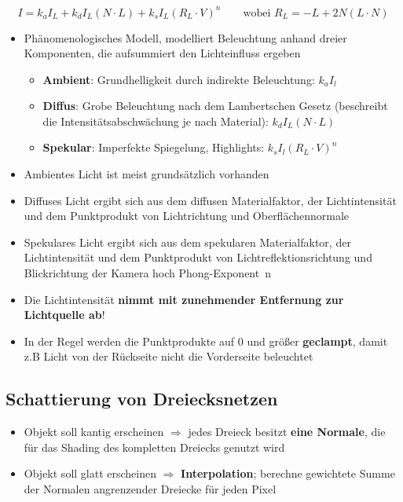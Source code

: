 \documentclass[10pt,a4paper]{article}
\begin{document}
        $$I = k_a I_L + k_d I_L (N \cdot L) + k_s I_L (R_L \cdot V)^n \qquad \text{wobei } R_L = -L + 2N(L \cdot N)$$
	\begin{itemize}
		\item Phänomenologisches Modell, modelliert Beleuchtung anhand dreier Komponenten, die aufsummiert den Lichteinfluss ergeben
		\begin{itemize}
			\item \textbf{Ambient}: Grundhelligkeit durch indirekte Beleuchtung: $k_a I_l$
			\item \textbf{Diffus}: Grobe Beleuchtung nach dem Lambertschen Gesetz (beschreibt die Intensitätsabschwächung je nach Material):
                          $k_d I_L (N \cdot L)$
			\item \textbf{Spekular}: Imperfekte Spiegelung, \glqq Highlights\grqq:
                          $k_s I_l (R_L \cdot V)^n$
		\end{itemize}
		\item Ambientes Licht ist meist grundsätzlich vorhanden
		\item Diffuses Licht ergibt sich aus dem diffusen Materialfaktor, der Lichtintensität und dem Punktprodukt von Lichtrichtung und Oberflächennormale
		\item Spekulares Licht ergibt sich aus dem spekularen Materialfaktor, der Lichtintensität und dem Punktprodukt von Lichtreflektionsrichtung und Blickrichtung der Kamera hoch \glqq Phong-Exponent\grqq\ n
		\item Die Lichtintensität \textbf{nimmt mit zunehmender Entfernung zur Lichtquelle ab}!
		\item In der Regel werden die Punktprodukte auf 0 und größer \textbf{\glqq geclampt\grqq}, damit z.B Licht von der Rückseite nicht die Vorderseite beleuchtet
        \end{itemize}

	\subsection{Schattierung von Dreiecksnetzen}
	\label{rt:sub:schattierung_von_dreiecksnetzen}
	
	\begin{itemize}
		\item Objekt soll kantig erscheinen $\Rightarrow$ jedes Dreieck besitzt \textbf{eine Normale}, die für das Shading des kompletten Dreiecks genutzt wird
		\item Objekt soll glatt erscheinen $\Rightarrow$ \textbf{Interpolation}; berechne gewichtete Summe der Normalen angrenzender Dreiecke für jeden Pixel
	\end{itemize}
\end{document}
